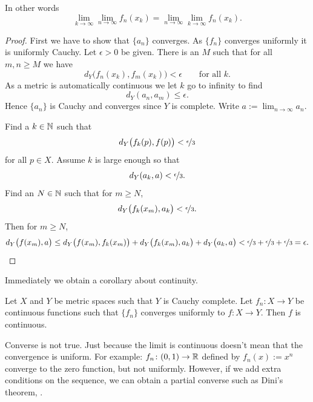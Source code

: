 In other words
\begin{equation*}
\lim_{k \to \infty} \lim_{n\to\infty} f_n(x_k) =
\lim_{n \to \infty} \lim_{k\to\infty} f_n(x_k) .
\end{equation*}

\begin{proof}
First we have to show that $\{ a_n \}$ converges.  As
$\{ f_n \}$ converges uniformly it is uniformly Cauchy. 
Let $\epsilon > 0$ be given.  There is
an $M$ such that for all $m,n \geq M$ we have
\begin{equation*}
d_Y\bigl(f_n(x_k),f_m(x_k)\bigr) < \epsilon \qquad \text{for all $k$} .
\end{equation*}
As a metric is automatically continuous we let $k$ go to infinity
to find
\begin{equation*}
d_Y(a_n,a_m) \leq \epsilon .
\end{equation*}
Hence $\{a_n\}$ is Cauchy and converges since $Y$ is complete.  Write
$a := \lim_{n\to\infty} a_n$.

Find a $k \in {\mathbb{N}}$ such that
\begin{equation*}
d_Y\bigl(f_k(p),f(p)\bigr) < \nicefrac{\epsilon}{3}
\end{equation*}
for all $p \in X$.  Assume $k$ is large enough
so that
\begin{equation*}
d_Y(a_k,a) < \nicefrac{\epsilon}{3}  .
\end{equation*}
Find an $N \in {\mathbb{N}}$ such that for $m \geq N$,
\begin{equation*}
d_Y\bigl(f_k(x_m),a_k\bigr) < \nicefrac{\epsilon}{3}  .
\end{equation*}
Then for
$m \geq N$,
\begin{equation*}
d_Y\bigl(f(x_m),a\bigr)
\leq
d_Y\bigl(f(x_m),f_k(x_m)\bigr)
+
d_Y\bigl(f_k(x_m),a_k\bigr)
+
d_Y\bigl(a_k,a\bigr)
<
\nicefrac{\epsilon}{3} +
\nicefrac{\epsilon}{3} +
\nicefrac{\epsilon}{3} = \epsilon . \qedhere
\end{equation*}
\end{proof}

Immediately we obtain a corollary about continuity.

\begin{cor} \label{cor:metricuniformcontinuous}
Let $X$ and $Y$ be metric spaces such that $Y$ is Cauchy complete.
Let $f_n \colon X \to Y$ be continuous functions
such that
$\{ f_n \}$ converges uniformly to $f \colon X \to Y$.  
Then $f$ is continuous.
\end{cor}

Converse is not true.  Just because the limit is continuous doesn't mean
that the convergence is uniform.  For example:
$f_n \colon (0,1) \to {\mathbb{R}}$ defined by $f_n(x) := x^n$ converge to
the zero function, but not uniformly.  However, if we add extra conditions
on the sequence, we can obtain a partial converse such as Dini's theorem,
.

